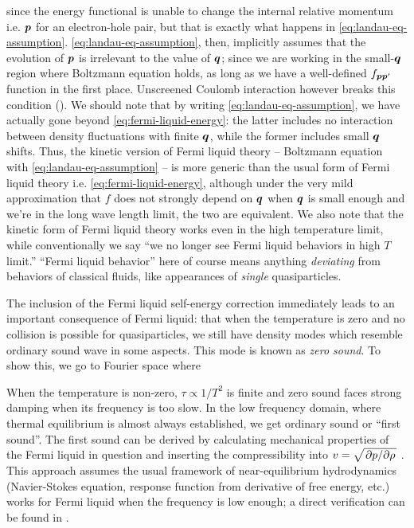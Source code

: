 \documentclass[hyperref, a4paper]{article}
\begin{document}
since the energy functional is unable to change the internal relative momentum
i.e. $\vb*{p}$ for an electron-hole pair,
but that is exactly what happens in \eqref{eq:landau-eq-assumption}.
\eqref{eq:landau-eq-assumption}, then, implicitly assumes 
that the evolution of $\vb*{p}$ is irrelevant to the value of $\vb*{q}$;
since we are working in the small-$\vb*{q}$ region where Boltzmann equation holds,
as long as we have a well-defined $f_{\vb*{p} \vb*{p}'}$ function 
in the first place.
Unscreened Coulomb interaction however breaks this condition
().
We should note that by writing \eqref{eq:landau-eq-assumption},
we have actually gone beyond \eqref{eq:fermi-liquid-energy}:
the latter includes no interaction between density fluctuations with finite $\vb*{q}$,
while the former includes small $\vb*{q}$ shifts.
Thus, the kinetic version of Fermi liquid theory -- Boltzmann equation with \eqref{eq:landau-eq-assumption} --
is more generic than the usual form of Fermi liquid theory i.e. \eqref{eq:fermi-liquid-energy},
although under the very mild approximation that $f$ does not strongly depend on $\vb*{q}$
when $\vb*{q}$ is small enough and we're in the long wave length limit,
the two are equivalent.
We also note that the kinetic form of Fermi liquid theory works even in the high temperature limit,
while conventionally we say ``we no longer see Fermi liquid behaviors in high $T$ limit.''
``Fermi liquid behavior'' here of course means anything \emph{deviating} from behaviors of classical fluids,
like appearances of \emph{single} quasiparticles.

The inclusion of the Fermi liquid self-energy correction 
immediately leads to an important consequence 
of Fermi liquid: 
that when the temperature is zero and 
no collision is possible for quasiparticles, 
we still have density modes which resemble 
ordinary sound wave in some aspects. 
This mode is known as \emph{zero sound}.
To show this, we go to Fourier space where 

When the temperature is non-zero,
$\tau \propto 1 / T^2$ is finite 
and zero sound faces strong damping 
when its frequency is too slow.
In the low frequency domain, 
where thermal equilibrium is almost always established,
we get ordinary sound or ``first sound''.
The first sound can be derived 
by calculating mechanical properties of the Fermi liquid in question 
and inserting the compressibility 
into $v = \sqrt{\pdv*{p}{\rho}}$ \cite{lifshitz2013statistical}.
This approach assumes the usual framework of near-equilibrium hydrodynamics 
(Navier-Stokes equation, response function from derivative of free energy, etc.)
works for Fermi liquid when the frequency is low enough; 
a direct verification can be found in \cite{belitz2022soft}.
\end{document}
